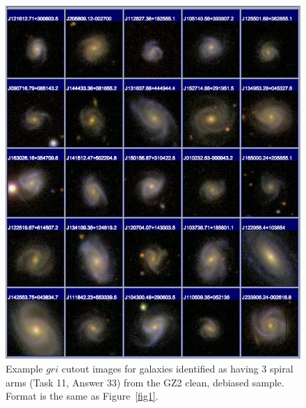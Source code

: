 \documentclass[useAMS,usenatbib]{mn2e}
\begin{document}
\newpage
\clearpage
\begin{figure}
\includegraphics[angle=0,width=7.0in]{figures/gallery/spiral3.png}
\caption{Example $gri$ cutout images for galaxies identified as having 3 spiral arms (Task 11, Answer 33) from the GZ2 clean, debiased sample. Format is the same as Figure~\ref{fig1}.}
\end{figure}
\end{document}
